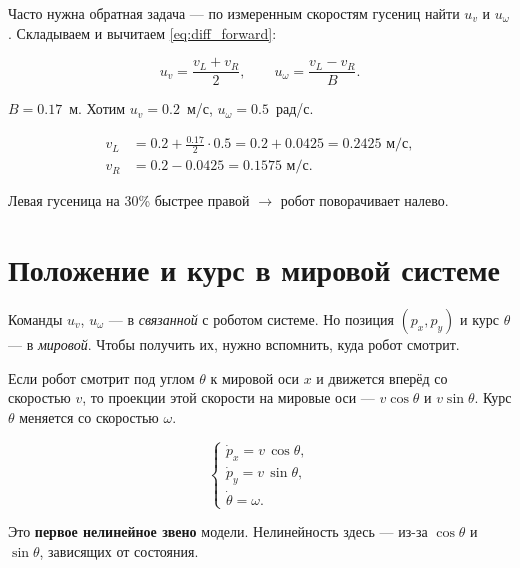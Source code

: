 Часто нужна обратная задача --- по измеренным скоростям гусениц найти
$u_v$ и $u_\omega$. Складываем и вычитаем \eqref{eq:diff_forward}:

\begin{equation}
  u_v = \frac{v_L + v_R}{2},
  \qquad
  u_\omega = \frac{v_L - v_R}{B}.
  \label{eq:diff_inverse}
\end{equation}

\begin{examplebox}[title={Численный пример}]
$B = 0.17$~м. Хотим $u_v = 0.2$~м/с, $u_\omega = 0.5$~рад/с.

\begin{align*}
  v_L &= 0.2 + \tfrac{0.17}{2}\cdot 0.5 = 0.2 + 0.0425 = 0.2425 \text{ м/с},\\
  v_R &= 0.2 - 0.0425 = 0.1575 \text{ м/с}.
\end{align*}

Левая гусеница на 30\% быстрее правой $\to$ робот поворачивает налево.
\end{examplebox}

\section{Положение и курс в мировой системе}

Команды $u_v$, $u_\omega$ --- в \emph{связанной} с роботом системе. Но
позиция $(p_x, p_y)$ и курс $\theta$ --- в \emph{мировой}. Чтобы
получить их, нужно вспомнить, куда робот смотрит.

\begin{ideabox}
Если робот смотрит под углом $\theta$ к мировой оси $x$ и движется вперёд
со скоростью $v$, то проекции этой скорости на мировые оси --- $v\cos\theta$
и $v\sin\theta$. Курс $\theta$ меняется со скоростью $\omega$.
\end{ideabox}

\begin{formulabox}[title={Кинематика робота в мировой СК}]
\begin{equation}
  \begin{cases}
    \dot{p}_x = v\,\cos\theta,\\[2pt]
    \dot{p}_y = v\,\sin\theta,\\[2pt]
    \dot{\theta} = \omega.
  \end{cases}
  \label{eq:world_kinematics}
\end{equation}
\end{formulabox}

Это \textbf{первое нелинейное звено} модели. Нелинейность здесь --- из-за
$\cos\theta$ и $\sin\theta$, зависящих от состояния.


